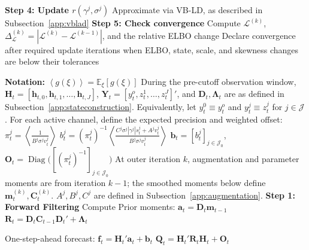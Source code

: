 \documentclass[APA,STIX1COL]{WileyNJD-v2}
\begin{document}
\begin{algorithm}
\begin{algorithmic}
        \State \textbf{Step 4: Update $r(\gamma^j, \sigma^j )$}
        \State Approximate via VB-LD, as described in Subsection~\ref{app:vblad}
    \EndFor
    \State \textbf{Step 5: Check convergence}
    \State Compute \(\mathcal{L}^{(k)}\), \(\Delta_{\mathcal{L}}^{(k)}=|\mathcal{L}^{(k)}-\mathcal{L}^{(k-1)}|\), and the relative ELBO change
    \State Declare convergence after required update iterations when ELBO,
    \Statex \hspace{\algorithmicindent} state, scale, and skewness changes are below their tolerances
\EndWhile

\end{algorithmic}
\end{algorithm}

\begin{algorithm}
\caption{VB-Filtering and VB-Smoothing}
\label{alg:Alg4}
\begin{algorithmic}

\State \textbf{Notation:}
\State $\left\langle g(\xi) \right\rangle = \mathbb{E}_\xi\left[ g(\xi) \right]$
\State  During the pre-cutoff observation window, \(\mathbf{H}_t = [\mathbf{h}_{t,0}, \mathbf{h}_{t,1}, \ldots, \mathbf{h}_{t,J}]\), \(\mathbf{Y}_t = [y_t^o, z_t^1, \ldots, z_t^J]'\), and \(\mathbf{D}_t, \boldsymbol{\Lambda}_t\) are as defined in Subsection~\ref{app:stateconstruction}.
\State  Equivalently, let \(y_t^0 \equiv y_t^o\) and \(y_t^j \equiv z_t^j\) for \(j\in\mathcal{J}\).
\State For each active channel, define the expected precision and weighted offset:
\State $\pi_t^j=\left\langle\frac{1}{B^j\sigma^jv_t^j}\right\rangle$
\State $b_t^j=(\pi_t^j)^{-1}\left\langle\frac{C^j\sigma^j|\gamma^j|s_t^j+A^jv_t^j}{B^j\sigma^jv_t^j}\right\rangle$
\State $\mathbf b_t=[b_t^j]_{j\in\mathcal J_0}$, \quad $\mathbf O_t=\operatorname{Diag}\big([(\pi_t^j)^{-1}]_{j\in\mathcal J_0}\big)$
\State At outer iteration \(k\), augmentation and parameter moments are from iteration \(k-1\); the smoothed moments below define \(\mathbf m_t^{(k)},\mathbf C_t^{(k)}\).
\State \(A^j,B^j,C^j\) are defined in Subsection~\ref{app:augmentation}.
\State \textbf{Step 1: Forward Filtering}
    \State Compute Prior moments:
    \State $\mathbf{a}_t = \mathbf{D}_t \mathbf{m}_{t-1}$
    \State $\mathbf{R}_t = \mathbf{D}_t \mathbf{C}_{t-1} \mathbf{D}_t' +  \boldsymbol{\Lambda}_t$

    \State One-step-ahead forecast:
    \State $\mathbf{f}_t = \mathbf{H}_t'\mathbf{a}_t + \mathbf{b}_t$
    \State $\mathbf{Q}_t = \mathbf{H}_t'\mathbf{R}_t\mathbf{H}_t + \mathbf{O}_t$


\end{algorithmic}
\end{algorithm}
\end{document}
